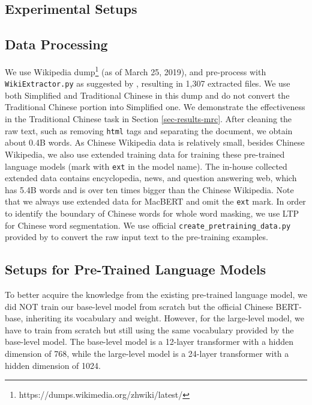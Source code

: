 \documentclass[journal]{IEEEtran}
\begin{document}
\begin{CJK*}{UTF8}{gbsn}
\section{Experimental Setups}
\subsection{Data Processing}
We use Wikipedia dump\footnote{https://dumps.wikimedia.org/zhwiki/latest/} (as of March 25, 2019), and pre-process with {\tt WikiExtractor.py} as suggested by \cite{devlin-etal-2019-bert}, resulting in 1,307 extracted files. 
We use both Simplified and Traditional Chinese in this dump and do not convert the Traditional Chinese portion into Simplified one. We demonstrate the effectiveness in the Traditional Chinese task in Section \ref{sec-results-mrc}.
After cleaning the raw text, such as removing {\tt html} tags and separating the document, we obtain about 0.4B words.
As Chinese Wikipedia data is relatively small, besides Chinese Wikipedia, we also use extended training data for training these pre-trained language models (mark with {\tt ext} in the model name).
The in-house collected extended data contains encyclopedia, news, and question answering web, which has 5.4B words and is over ten times bigger than the Chinese Wikipedia.
Note that we always use extended data for MacBERT and omit the {\tt ext} mark.
In order to identify the boundary of Chinese words for whole word masking, we use LTP \cite{che2010ltp} for Chinese word segmentation.
We use official {\tt create\_pretraining\_data.py} provided by \cite{devlin-etal-2019-bert} to convert the raw input text to the pre-training examples.

\subsection{Setups for Pre-Trained Language Models}
To better acquire the knowledge from the existing pre-trained language model, we did NOT train our base-level model from scratch but the official Chinese BERT-base, inheriting its vocabulary and weight.
However, for the large-level model, we have to train from scratch but still using the same vocabulary provided by the base-level model.
The base-level model is a 12-layer transformer with a hidden dimension of 768, while the large-level model is a 24-layer transformer with a hidden dimension of 1024.


\end{CJK*}
\end{document}

